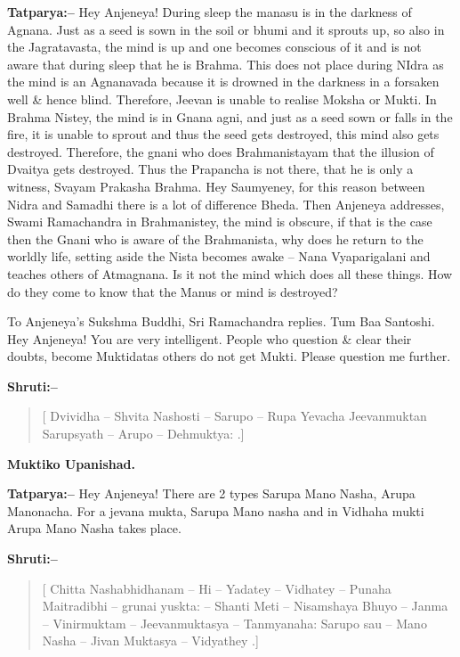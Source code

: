 \textbf{Tatparya:–} Hey Anjeneya! During sleep the manasu is in the darkness of Agnana. Just as a seed is sown in the soil or bhumi and it sprouts up, so also in the Jagratavasta, the mind is up and one becomes conscious of it and is not aware that during sleep that he is Brahma. This does not place during NIdra as the mind is an Agnanavada because it is drowned in the darkness in a forsaken well \& hence blind. Therefore, Jeevan is unable to realise Moksha or Mukti. In Brahma Nistey, the mind is in Gnana agni, and just as a seed sown or falls in the fire, it is unable to sprout and thus the seed gets destroyed, this mind also gets destroyed. Therefore, the gnani who does Brahmanistayam that the illusion of Dvaitya gets destroyed. Thus the Prapancha is not there, that he is only a witness, Svayam Prakasha Brahma. Hey Saumyeney, for this reason between Nidra and Samadhi there is a lot of difference Bheda. Then Anjeneya addresses, Swami Ramachandra in Brahmanistey, the mind is obscure, if that is the case then the Gnani who is aware of the Brahmanista, why does he return to the worldly life, setting aside the Nista becomes awake – Nana Vyaparigalani and teaches others of Atmagnana. Is it not the mind which does all these things. How do they come to know that the Manus or mind is destroyed?

To Anjeneya's Sukshma Buddhi, Sri Ramachandra replies. Tum Baa Santoshi. Hey Anjeneya! You are very intelligent. People who question \& clear their doubts, become Muktidatas others do not get Mukti. Please question me further.

\textbf{Shruti:–}

\begin{verse}
[ Dvividha – Shvita Nashosti – Sarupo – Rupa Yevacha  Jeevanmuktan Sarupsyath – Arupo – Dehmuktya: .]
\end{verse}

\begin{flushright}
\textbf{Muktiko Upanishad.}
\end{flushright}

\textbf{Tatparya:–} Hey Anjeneya! There are 2 types Sarupa Mano Nasha, Arupa Manonacha. For a jevana mukta, Sarupa Mano nasha and in Vidhaha mukti Arupa Mano Nasha takes place.

\textbf{Shruti:–}

\begin{verse}
[ Chitta Nashabhidhanam – Hi – Yadatey – Vidhatey – Punaha  Maitradibhi – grunai yuskta: – Shanti Meti – Nisamshaya  Bhuyo – Janma – Vinirmuktam – Jeevanmuktasya – Tanmyanaha: Sarupo sau – Mano Nasha – Jivan Muktasya – Vidyathey .]
\end{verse}

